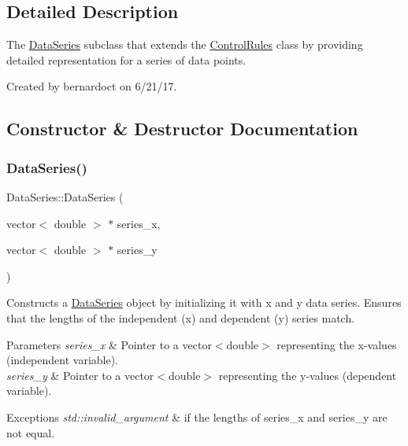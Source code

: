 \subsection{Detailed Description}
The \mbox{\hyperlink{classDataSeries}{Data\+Series}} subclass that extends the \mbox{\hyperlink{classControlRules}{Control\+Rules}} class by providing detailed representation for a series of data points. 

Created by bernardoct on 6/21/17. 

\subsection{Constructor \& Destructor Documentation}
\mbox{\label{classDataSeries_a8af4ff388a574c8b836c2880492a8423}} 
\subsubsection{\texorpdfstring{Data\+Series()}{DataSeries()}}
{\footnotesize\ttfamily Data\+Series\+::\+Data\+Series (\begin{DoxyParamCaption}\item[{vector$<$ double $>$ $\ast$}]{series\+\_\+x,  }\item[{vector$<$ double $>$ $\ast$}]{series\+\_\+y }\end{DoxyParamCaption})}



Constructs a {\ttfamily \mbox{\hyperlink{classDataSeries}{Data\+Series}}} object by initializing it with x and y data series. Ensures that the lengths of the independent ({\ttfamily x}) and dependent ({\ttfamily y}) series match. 


\begin{DoxyParams}{Parameters}
{\em series\+\_\+x} & Pointer to a {\ttfamily vector$<$double$>$} representing the x-\/values (independent variable). \\
\hline
{\em series\+\_\+y} & Pointer to a {\ttfamily vector$<$double$>$} representing the y-\/values (dependent variable). \\
\hline
\end{DoxyParams}

\begin{DoxyExceptions}{Exceptions}
{\em std\+::invalid\+\_\+argument} & if the lengths of {\ttfamily series\+\_\+x} and {\ttfamily series\+\_\+y} are not equal. \\
\hline
\end{DoxyExceptions}


